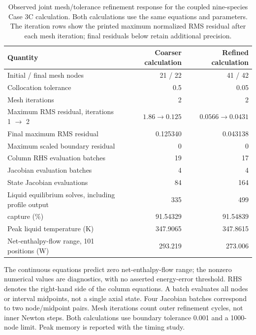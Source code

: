 \begin{table}[pos=htbp]
  \centering
  \caption{Observed joint mesh/tolerance refinement response for the coupled nine-species Case 3C calculation. Both calculations use the same equations and parameters. The iteration rows show the printed maximum normalized RMS residual after each mesh iteration; final residuals below retain additional precision.}
  \label{tab:reactive-numerical-verification}
  \small
  \renewcommand{\arraystretch}{1.12}
  \begin{tabularx}{\textwidth}{@{}Xrr@{}}
    \toprule
    Quantity & Coarser calculation & Refined calculation \\
    \midrule
    Initial / final mesh nodes & 21 / 22 & 41 / 42 \\
    Collocation tolerance & 0.5 & 0.05 \\
    Mesh iterations & 2 & 2 \\
    Maximum RMS residual, iterations 1 $\to$ 2 & $1.86\to0.125$ & $0.0566\to0.0431$ \\
    Final maximum RMS residual & 0.125340 & 0.043138 \\
    Maximum scaled boundary residual & 0 & 0 \\
    Column RHS evaluation batches & 19 & 17 \\
    Jacobian evaluation batches & 4 & 4 \\
    State Jacobian evaluations & 84 & 164 \\
    Liquid equilibrium solves, including profile output & 335 & 499 \\
    \COtwo{} capture (\unit{\percent}) & 91.54329 & 91.54839 \\
    Peak liquid temperature (\unit{K}) & 347.9065 & 347.8615 \\
    Net-enthalpy-flow range, 101 positions (\unit{W}) & 293.219 & 273.006 \\
    \bottomrule
  \end{tabularx}
  \par\smallskip
  \begin{minipage}{\textwidth}\footnotesize
    The continuous equations predict zero net-enthalpy-flow range; the nonzero numerical values are diagnostics, with no asserted energy-error threshold. RHS denotes the right-hand side of the column equations. A batch evaluates all nodes or interval midpoints, not a single axial state. Four Jacobian batches correspond to two node/midpoint pairs. Mesh iterations count outer refinement cycles, not inner Newton steps. Both calculations use boundary tolerance \num{0.001} and a 1000-node limit. Peak memory is reported with the timing study.
  \end{minipage}
\end{table}
